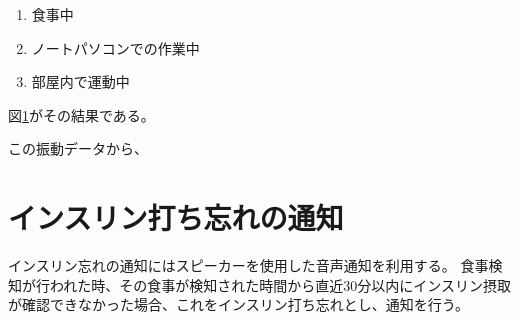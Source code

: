 \begin{enumerate}
  \item 食事中
  \item ノートパソコンでの作業中
  \item 部屋内で運動中
\end{enumerate}

図\ref{}がその結果である。

この振動データから、

\section{インスリン打ち忘れの通知}

インスリン忘れの通知にはスピーカーを使用した音声通知を利用する。
食事検知が行われた時、その食事が検知された時間から直近30分以内にインスリン摂取が確認できなかった場合、これをインスリン打ち忘れとし、通知を行う。


